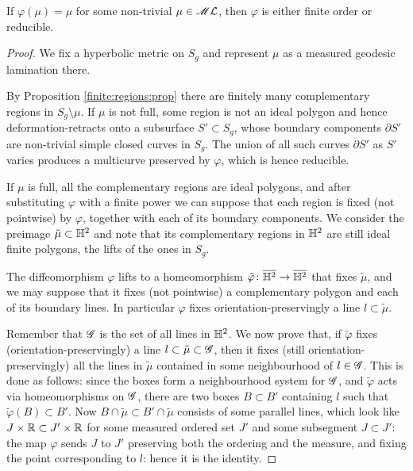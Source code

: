 \begin{prop} \label{varphi:fixes:mu:prop}
If $\varphi(\mu) = \mu$ for some non-trivial $\mu\in\mathscr{M}\mathcal{L}$, then $\varphi$ is either finite order or reducible.
\end{prop}
\begin{proof}
We fix a hyperbolic metric on $S_g$ and represent $\mu$ as a measured geodesic lamination there. 

By Proposition \ref{finite:regions:prop} there are finitely many complementary regions in $S_g\setminus \mu$. If $\mu$ is not full, some region is not an ideal polygon and hence deformation-retracts onto a subsurface $S'\subset S_g$, whose boundary components $\partial S'$ are non-trivial simple closed curves in $S_g$. The union of all such curves $\partial S'$ as $S'$ varies produces a multicurve preserved by $\varphi$, which is hence reducible.

If $\mu$ is full, all the complementary regions are ideal polygons, and after substituting $\varphi$ with a finite power we can suppose that each region is fixed (not pointwise) by $\varphi$, together with each of its boundary components. We consider the preimage $\tilde \mu \subset \mathbb{H}^2$ and note that its complementary regions in $\mathbb{H}^2$ are still ideal finite polygons, the lifts of the ones in $S_g$. 

The diffeomorphism $\varphi$ lifts to a homeomorphism $\tilde\varphi \colon \overline{\mathbb{H}^2} \to \overline{\mathbb{H}^2}$ that fixes $\tilde \mu$, and we may suppose that it fixes (not pointwise) a complementary polygon and each of its boundary lines. In particular $\varphi$ fixes orientation-preservingly a line $l\subset \tilde \mu$. 

Remember that $\mathscr{G}$ is the set of all lines in $\mathbb{H}^2$.
We now prove that, if $\tilde\varphi$ fixes (orientation-preservingly) a 
line $l\subset \tilde \mu \subset \mathscr{G}$, then it fixes (still orientation-preservingly) all the lines in $\tilde \mu$ contained in some neighbourhood of $l\in \mathscr{G}$. This is done as follows: since the boxes form a neighbourhood system for $\mathscr{G}$, and $\tilde\varphi$ acts via homeomorphisms on $\mathscr{G}$, there are two boxes $B\subset B'$ containing $l$ such that $\tilde\varphi(B) \subset B'$. Now $B\cap \tilde \mu \subset B'\cap \tilde \mu$ consists of some parallel lines, which look like $J\times \mathbb{R} \subset J' \times \mathbb{R}$ for some measured ordered set $J'$ and some subsegment $J\subset J'$: the map $\varphi$ sends  $J$ to $J'$ preserving both the ordering and the measure, and fixing the point corresponding to $l$: hence it is the identity.


\end{proof}

